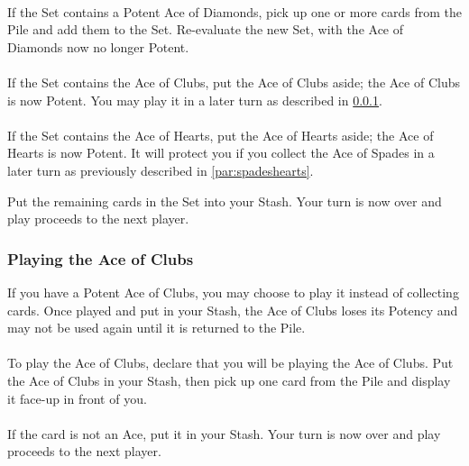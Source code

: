 \documentclass{article}
\begin{document}
\paragraph{}
If the Set contains a Potent Ace of Diamonds, pick up one or more cards
from the Pile and add them to the Set. Re-evaluate the new Set, with the
Ace of Diamonds now no longer Potent.

\paragraph{}
If the Set contains the Ace of Clubs, put the Ace of Clubs aside; the
Ace of Clubs is now Potent. You may play it in a later turn as described
in \ref{sec:playac}.

\paragraph{}
If the Set contains the Ace of Hearts, put the Ace of Hearts aside; the
Ace of Hearts is now Potent. It will protect you if you collect the Ace
of Spades in a later turn as previously described in
\ref{par:spadeshearts}.

Put the remaining cards in the Set into your Stash. Your turn is now
over and play proceeds to the next player.

\subsubsection{Playing the Ace of Clubs}
\label{sec:playac}

If you have a Potent Ace of Clubs, you may choose to play it instead of
collecting cards. Once played and put in your Stash, the Ace of Clubs
loses its Potency and may not be used again until it is returned to the
Pile.

\paragraph{}
To play the Ace of Clubs, declare that you will be playing the Ace of
Clubs. Put the Ace of Clubs in your Stash, then pick up one card from
the Pile and display it face-up in front of you.

\paragraph{}
If the card is not an Ace, put it in your Stash. Your turn is now over
and play proceeds to the next player.
\end{document}
